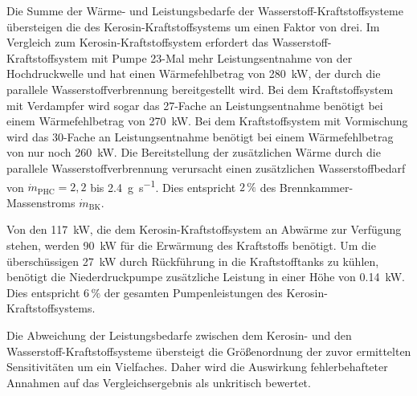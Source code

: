 Die Summe der Wärme- und Leistungsbedarfe der Wasserstoff-Kraftstoffsysteme übersteigen die des Kerosin-Kraftstoffsystems um einen Faktor von drei. Im Vergleich zum Kerosin-Kraftstoffsystem erfordert das Wasserstoff-Kraftstoffsystem mit Pumpe 23-Mal mehr Leistungsentnahme von der Hochdruckwelle und hat einen Wärmefehlbetrag von \SI{280}{\kilo\W}, der durch die parallele Wasserstoffverbrennung bereitgestellt wird. Bei dem Kraftstoffsystem mit Verdampfer wird sogar das 27-Fache an Leistungsentnahme benötigt bei einem Wärmefehlbetrag von \SI{270}{\kilo\W}. Bei dem Kraftstoffsystem mit Vormischung wird das 30-Fache an Leistungsentnahme benötigt bei einem Wärmefehlbetrag von nur noch \SI{260}{\kilo\W}. Die Bereitstellung der zusätzlichen Wärme durch die parallele Wasserstoffverbrennung verursacht einen zusätzlichen Wasserstoffbedarf von $\dot{m}_\mathrm{PHC}=2,2$ bis \SI{2.4}{\g\per\s}. Dies entspricht $2\,\%$ des Brennkammer-Massenstroms $\dot{m}_\mathrm{BK}$.

Von den \SI{117}{\kilo\W}, die dem Kerosin-Kraftstoffsystem an Abwärme zur Verfügung stehen, werden \SI{90}{\kilo\W} für die Erwärmung des Kraftstoffs benötigt. Um die überschüssigen \SI{27}{\kilo\W} durch Rückführung in die Kraftstofftanks zu kühlen, benötigt die Niederdruckpumpe zusätzliche Leistung in einer Höhe von \SI{0,14}{\kilo\W}. Dies entspricht $6\,\%$ der gesamten Pumpenleistungen des Kerosin-Kraftstoffsystems.

Die Abweichung der Leistungsbedarfe zwischen dem Kerosin- und den Wasserstoff-Kraftstoffsysteme übersteigt die Größenordnung der zuvor ermittelten Sensitivitäten um ein Vielfaches. Daher wird die Auswirkung fehlerbehafteter Annahmen auf das Vergleichsergebnis als unkritisch bewertet. 

